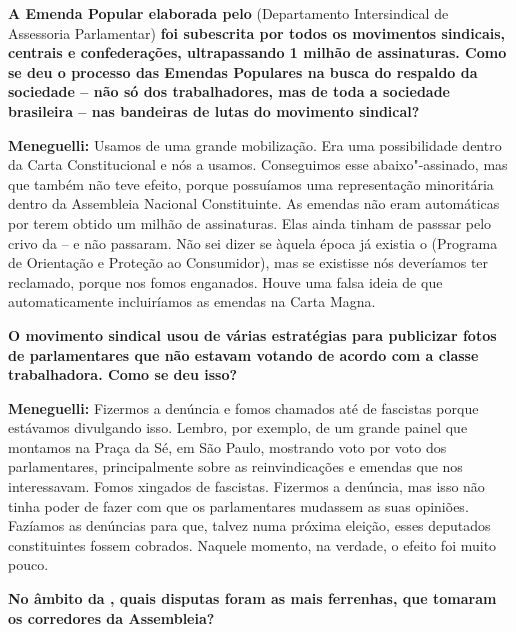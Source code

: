 \textbf{A Emenda Popular elaborada pelo}  (Departamento
Intersindical de Assessoria Parlamentar) \textbf{foi subescrita por
todos os movimentos sindicais, centrais e confederações, ultrapassando 1
milhão de assinaturas. Como se deu o processo das Emendas Populares na
busca do respaldo da sociedade -- não só dos trabalhadores, mas de toda
a sociedade brasileira -- nas bandeiras de lutas do movimento sindical?}

\textbf{Meneguelli:} Usamos de uma grande mobilização. Era uma
possibilidade dentro da Carta Constitucional e nós a usamos. Conseguimos
esse abaixo"-assinado, mas que também não teve efeito, porque possuíamos
uma representação minoritária dentro da Assembleia Nacional
Constituinte. As emendas não eram automáticas por terem obtido um milhão
de assinaturas. Elas ainda tinham de passsar pelo crivo da  -- e não
passaram. Não sei dizer se àquela época já existia o  (Programa de
Orientação e Proteção ao Consumidor), mas se existisse nós deveríamos
ter reclamado, porque nos fomos enganados. Houve uma falsa ideia de que
automaticamente incluiríamos as emendas na Carta Magna.

\textbf{O movimento sindical usou de várias estratégias para publicizar
fotos de parlamentares que não estavam votando de acordo com a classe
trabalhadora. Como se deu isso?}

\textbf{Meneguelli:} Fizermos a denúncia e fomos chamados até de
fascistas porque estávamos divulgando isso. Lembro, por exemplo, de um
grande painel que montamos na Praça da Sé, em São Paulo, mostrando voto
por voto dos parlamentares, principalmente sobre as reinvindicações e
emendas que nos interessavam. Fomos xingados de fascistas. Fizermos a
denúncia, mas isso não tinha poder de fazer com que os parlamentares
mudassem as suas opiniões. Fazíamos as denúncias para que, talvez numa
próxima eleição, esses deputados constituintes fossem cobrados. Naquele
momento, na verdade, o efeito foi muito pouco.

\textbf{No âmbito da , quais disputas foram as mais ferrenhas, que
tomaram os corredores da Assembleia?}

